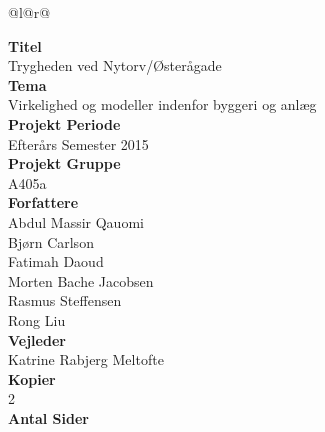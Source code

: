\begin{nopagebreak}
	{\begin{center}
			\begin{tabular*}{\textwidth}{@{}l@{\extracolsep{\fill}}r@{}}
				\\
				\begin{minipage}[t]{0.49\textwidth}
					\textbf{Titel}\\
					Trygheden ved Nytorv/Østerågade\\

					\textbf{Tema}\\
					Virkelighed og modeller indenfor byggeri og anlæg\\

					\textbf{Projekt Periode}\\
					Efterårs Semester 2015\\

					\textbf{Projekt Gruppe}\\
					A405a\\

					\textbf{Forfattere}\\
					Abdul Massir Qauomi\\
					Bjørn Carlson\\
					Fatimah Daoud\\
					Morten Bache Jacobsen\\
					Rasmus Steffensen\\
					Rong Liu\\

					\textbf{Vejleder}\\
					Katrine Rabjerg Meltofte\\

					\textbf{Kopier}\\
					2\\ %

					\textbf{Antal Sider}\\
					\pageref{LastPage}\\


\end{minipage}
\end{tabular*}
\end{center}}
\end{nopagebreak}
